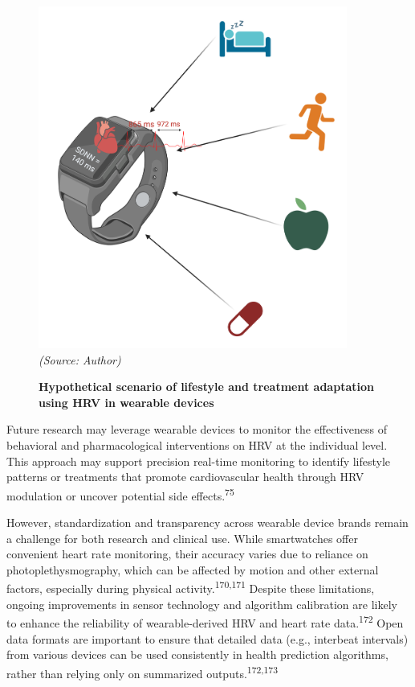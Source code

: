 \documentclass[
  a4paper,
  headsepline=true,
  open=left]{scrbook}
\begin{document}
\begin{figure}

{\centering 

\includegraphics[width=4in,height=\textheight]{images/smartwatch.png}
\emph{(Source: Author)}

}

\caption{\label{fig-smw}\textbf{Hypothetical scenario of lifestyle and
treatment adaptation using HRV in wearable devices}}

\end{figure}

Future research may leverage wearable devices to monitor the
effectiveness of behavioral and pharmacological interventions on HRV at
the individual level. This approach may support precision real-time
monitoring to identify lifestyle patterns or treatments that promote
cardiovascular health through HRV modulation or uncover potential side
effects.\textsuperscript{75}

However, standardization and transparency across wearable device brands
remain a challenge for both research and clinical use. While
smartwatches offer convenient heart rate monitoring, their accuracy
varies due to reliance on photoplethysmography, which can be affected by
motion and other external factors, especially during physical
activity.\textsuperscript{170,171} Despite these limitations, ongoing
improvements in sensor technology and algorithm calibration are likely
to enhance the reliability of wearable-derived HRV and heart rate
data.\textsuperscript{172} Open data formats are important to ensure
that detailed data (e.g., interbeat intervals) from various devices can
be used consistently in health prediction algorithms, rather than
relying only on summarized outputs.\textsuperscript{172,173}
\end{document}

